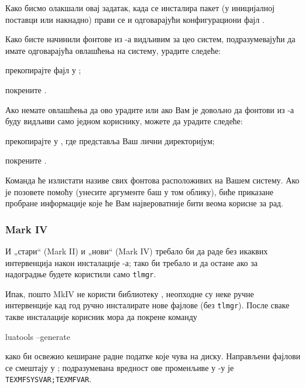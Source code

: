 \documentclass{article}
\begin{document}
Како бисмо олакшали овај задатак, када се инсталира пакет
 (у иницијалној поставци или накнадно) прави се и
одговарајући конфигурациони фајл
.

Како бисте начинили фонтове из \TL{}-а видљивим за цео систем,
подразумевајући да имате одговарајућа овлашћења на систему, урадите
следеће:
\begin{enumerate*}
\item прекопирајте фајл  у
  ;
\item покрените .
\end{enumerate*}

Ако немате овлашћења да ово урадите или ако Вам је довољно да фонтови
из \TL{}-а буду видљиви само једном кориснику, можете да урадите
следеће:
\begin{enumerate*}
\item прекопирајте  у
  , где \filename{~} представља Ваш лични
  директоријум;
\item покрените .
\end{enumerate*}

Команда  ће излистати називе свих фонтова расположивих
на Вашем систему. Ако је позовете помоћу
 (унесите аргументе баш у
том облику), биће приказане пробране информације које ће Вам
највероватније бити веома корисне за рад.


\subsubsection{\protect\ConTeXt{} Mark IV}
\label{sec:context-mkiv}

И „стари“ \ConTeXt{} (Mark II) и „нови“ \ConTeXt{} (Mark
IV) требало би да раде без икаквих интервенција након
инсталације \TL{}-а; тако би требало и да остане ако за надоградње
будете користили само \verb+tlmgr+.

Ипак, пошто \ConTeXt{} MkIV не користи библиотеку \KPS{},
неопходне су неке ручне интервенције кад год ручно инсталирате нове
фајлове (без \verb+tlmgr+). После сваке такве инсталације корисник
мора да покрене команду
\begin{sverbatim}
luatools --generate
\end{sverbatim}
како би освежио кеширане радне податке које \ConTeXt{} чува на диску.
Направљени фајлови се смештају у ; подразумевана
вредност ове променљиве у \TL-у је \verb+TEXMFSYSVAR;TEXMFVAR+.
\end{document}
